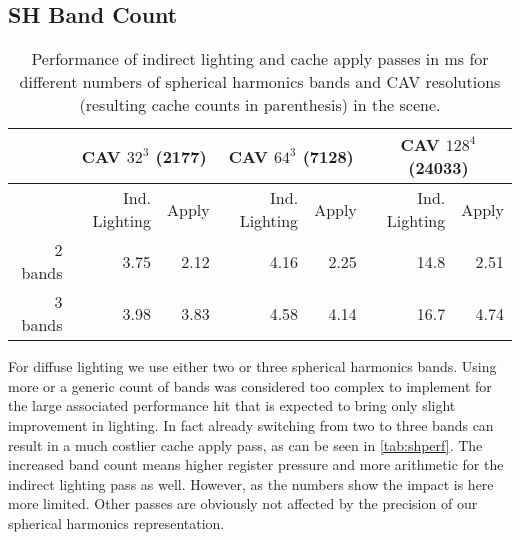 \documentclass[thesis.tex]{subfiles}
\begin{document}
\subsection{SH Band Count} \label{sec:eva:shperf}
\begin{table}[htbp]
  \centering
    \begin{tabular}{r|rr|rr|rr}
    \toprule
          & \multicolumn{2}{c|}{CAV $32^3$ (2177)} & \multicolumn{2}{c|}{CAV $64^3$ (7128)} & \multicolumn{2}{c}{CAV $128^4$ (24033)} \\
    \midrule
          & \small{Ind. Lighting} & Apply & Ind. Lighting & Apply & Ind. Lighting & Apply \\
    \midrule
    2 bands & 3.75  & 2.12  & 4.16  & 2.25  & 14.8  & 2.51 \\
    3 bands & 3.98  & 3.83  & 4.58  & 4.14  & 16.7  & 4.74 \\
    \bottomrule
    \end{tabular}
\caption{Performance of indirect lighting and cache apply passes in \si{\milli\second} for different numbers of spherical harmonics bands and CAV resolutions (resulting cache counts in parenthesis) in the  scene. }
\label{tab:shperf}
\end{table}
For diffuse lighting we use either two or three spherical harmonics bands.
Using more or a generic count of bands was considered too complex to implement for the large associated performance hit that is expected to bring only slight improvement in lighting.
In fact already switching from two to three bands can result in a much costlier cache apply pass, as can be seen in \autoref{tab:shperf}.
The increased band count means higher register pressure and more arithmetic for the indirect lighting pass as well.
However, as the numbers show the impact is here more limited.
Other passes are obviously not affected by the precision of our spherical harmonics representation.
\end{document}
